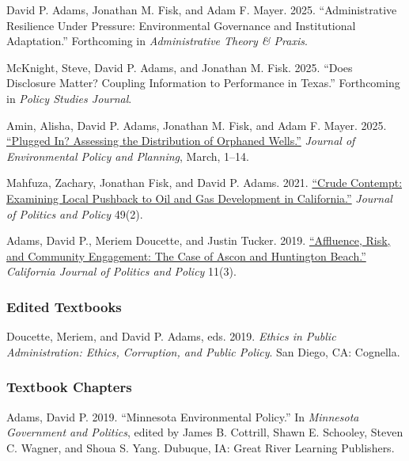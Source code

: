 \documentclass[12pt,letterpaper]{article}
\renewenvironment{itemize}{
  \begin{list}{}{
    \setlength{\leftmargin}{1.5em}
    \setlength{\itemsep}{0.25em}
    \setlength{\parskip}{0pt}
    \setlength{\parsep}{0.25em}
  }
}{
  \end{list}
}
\begin{document}
\begin{itemize}\leftmargin=2pt\itemindent=-15pt\leftmargin=2pt\itemindent=-15pt

    \item David P. Adams, Jonathan M. Fisk, and Adam F. Mayer. 2025. ``Administrative Resilience Under Pressure: Environmental Governance and Institutional Adaptation.'' Forthcoming in \emph{Administrative Theory \& Praxis}.

    \item McKnight, Steve, David P. Adams, and Jonathan M. Fisk. 2025. ``Does Disclosure Matter? Coupling Information to Performance in Texas.'' Forthcoming in \emph{Policy Studies Journal}.

    \item Amin, Alisha, David P. Adams, Jonathan M. Fisk, and Adam F. Mayer. 2025. \href{https://doi.org/10.1080/1523908X.2025.2480289}{``Plugged In? Assessing the Distribution of Orphaned Wells.''} \emph{Journal of Environmental Policy and Planning}, March, 1--14.

    \item Mahfuza, Zachary, Jonathan Fisk, and David P. Adams. 2021. \href{https://doi.org/10.1111/polp.12401}{``Crude Contempt: Examining Local Pushback to Oil and Gas Development in California.''} \emph{Journal of Politics and Policy} 49(2).

    \item Adams, David P., Meriem Doucette, and Justin Tucker. 2019. \href{https://escholarship.org/uc/item/2mz2n6qk}{``Affluence, Risk, and Community Engagement: The Case of Ascon and Huntington Beach.''} \emph{California Journal of Politics and Policy} 11(3).   

\end{itemize}

\subsubsection*{Edited Textbooks}
\begin{itemize}\leftmargin=2pt\itemindent=-15pt
    \item Doucette, Meriem, and David P. Adams, eds. 2019. \emph{Ethics in Public Administration: Ethics, Corruption, and Public Policy}. San Diego, CA: Cognella.
\end{itemize}

\subsubsection*{Textbook Chapters}
\begin{itemize}\leftmargin=2pt\itemindent=-15pt
    \item Adams, David P. 2019. ``Minnesota Environmental Policy.'' In \emph{Minnesota Government and Politics}, edited by James B. Cottrill, Shawn E. Schooley, Steven C. Wagner, and Shoua S. Yang. Dubuque, IA: Great River Learning Publishers.
\end{itemize}
\end{document}
